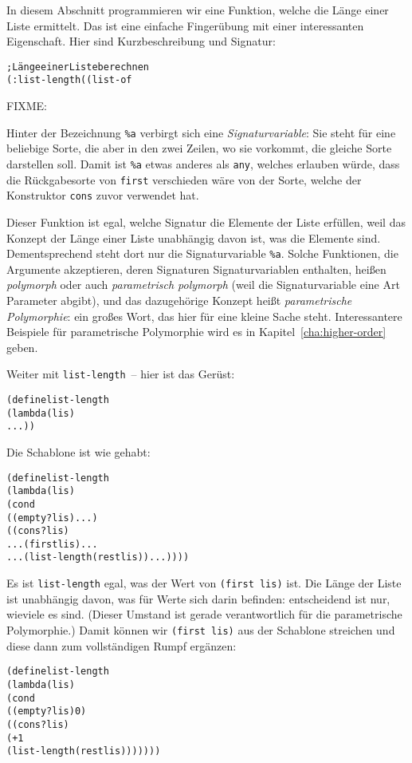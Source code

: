 In diesem Abschnitt programmieren wir eine Funktion, welche die Länge
einer Liste ermittelt. Das ist
eine einfache Fingerübung mit einer interessanten Eigenschaft.  Hier
sind Kurzbeschreibung und Signatur:
%
\begin{alltt}
; Länge einer Liste berechnen
(: list-length ((list-of %a) -> natural))
\end{alltt}
%
FIXME:

Hinter der Bezeichnung \verb$%a$ verbirgt sich eine 
\emph{Signaturvariable}: Sie
steht für eine beliebige Sorte, die aber in den zwei Zeilen, wo sie vorkommt,
die gleiche Sorte darstellen soll.  Damit ist \verb$%a$ etwas anderes als
\texttt{any}, welches erlauben würde, dass die Rückgabesorte von \texttt{first}
verschieden wäre von der Sorte, welche der Konstruktor \texttt{cons} zuvor
verwendet hat.


Dieser Funktion ist egal, welche Signatur
die Elemente der Liste erfüllen, weil das Konzept der Länge einer
Liste unabhängig davon ist, was die Elemente sind.
Dementsprechend steht dort nur die Signaturvariable \verb|%a|.
Solche Funktionen, die Argumente akzeptieren, deren Signaturen
Signaturvariablen enthalten, heißen \textit{polymorph} oder auch
\textit{parametrisch polymorph} (weil die Signaturvariable eine Art
Parameter abgibt), und das dazugehörige Konzept heißt
\textit{parametrische
  Polymorphie}:
ein großes Wort, das hier für eine kleine Sache steht.  Interessantere
Beispiele für parametrische Polymorphie wird es in
Kapitel~\ref{cha:higher-order} geben.

Weiter mit \texttt{list-length}~-- hier ist das Gerüst:
%
\begin{alltt}
(define list-length
  (lambda (lis)
    ...))
\end{alltt}
%
Die Schablone ist wie gehabt:
%
\begin{alltt}
(define list-length
  (lambda (lis)
    (cond
      ((empty? lis) ...)
      ((cons? lis) 
       ... (first lis) ...
       ... (list-length (rest lis)) ...))))
\end{alltt}
%
Es ist \texttt{list-length} egal, was der Wert von \texttt{(first
  lis)} ist.  Die Länge der Liste ist unabhängig davon, was für Werte
sich darin befinden: entscheidend ist nur, wieviele es sind.  (Dieser
Umstand ist gerade verantwortlich für die parametrische Polymorphie.)
Damit können wir \texttt{(first lis)} aus der Schablone streichen und
diese dann zum vollständigen Rumpf ergänzen:
%
\begin{alltt}
(define list-length
  (lambda (lis)
    (cond
      ((empty? lis) 0)
      ((cons? lis) 
       (+ 1 
          (list-length (rest lis)))))))
\end{alltt}
%

